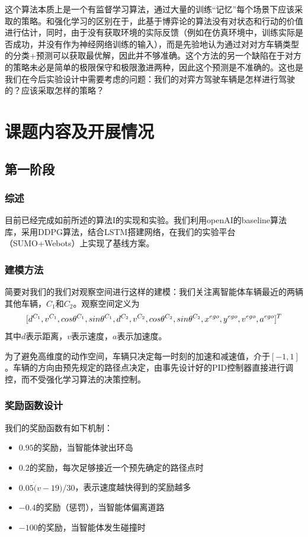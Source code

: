\documentclass[degree=bachelor, tocarialchapter, pifootnote]{thuthesis}
\begin{document}
    这个算法本质上是一个有监督学习算法，通过大量的训练``记忆''每个场景下应该采取的策略。和强化学习的区别在于，此基于博弈论的算法没有对状态和行动的价值进行估计，同时，由于没有获取环境的实际反馈（例如在仿真环境中，训练实际是否成功，并没有作为神经网络训练的输入），而是先验地认为通过对对方车辆类型的分类+预测可以获取最优解，因此并不够准确。这个方法的另一个缺陷在于对方的策略未必是简单的极限保守和极限激进两种，因此这个预测是不准确的。这也是我们在今后实验设计中需要考虑的问题：我们的对弈方驾驶车辆是怎样进行驾驶的？应该采取怎样的策略？\par

\section{课题内容及开展情况}
  \subsection{第一阶段}
  \subsubsection{综述}
  目前已经完成如前所述的算法I的实现和实验。我们利用openAI的baseline算法库\cite{openAI_baselines}，采用DDPG\cite{DDPG}算法，结合LSTM\cite{DRQ}搭建网络，在我们的实验平台（SUMO+Webots）上实现了基线方案。\par
  \subsubsection{建模方法}
  简要对我们的我们对观察空间进行这样的建模：我们关注离智能体车辆最近的两辆其他车辆，$C_1$和$C_2$。观察空间定义为
  $$[d^{C_1},\space v^{C_1},\space cos\theta^{C_1},\space sin\theta^{C_1},\space d^{C_2},\space v^{C_2},\space cos\theta^{C_2},\space sin\theta^{C_2},\space
  x^{ego},\space y^{ego},\space v^{ego},\space a^{ego}
  ]^T$$
  其中$d$表示距离，$v$表示速度，$a$表示加速度。\par
  为了避免高维度的动作空间，车辆只决定每一时刻的加速和减速值，介于$[-1, 1]$。车辆的方向由预先规定的路径点决定，由事先设计好的PID控制器直接进行调控，而不受强化学习算法的决策控制。
  \subsubsection{奖励函数设计}
  我们的奖励函数有如下机制：
  \begin{itemize}
    \item $0.95$的奖励，当智能体驶出环岛
    \item $0.2$的奖励，每次足够接近一个预先确定的路径点时
    \item $0.05 \dot (v-19)/30 $，表示速度越快得到的奖励越多
    \item $-0.4$的奖励（惩罚），当智能体偏离道路
    \item $-100$的奖励，当智能体发生碰撞时
  \end{itemize}
\end{document}
